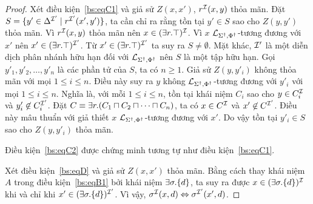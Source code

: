 \begin{proof}
	\semiItem Xét điều kiện~\eqref{bs:eqC1} và giả sử $Z(x,x')$, $r^{\mathcal{I}}(x,y)$ thỏa mãn. Đặt $S = \{y' \in \Delta^{\mathcal{I}'} \mid r^{\mathcal{I}'}(x',y')\}$, ta cần chỉ ra rằng tồn tại $y' \in S$ sao cho $Z(y,y')$ thỏa mãn. Vì $r^{\mathcal{I}}(x,y)$ thỏa mãn nên $x \in (\exists r.\top)^{\mathcal{I}}$. Vì $x$ $\mathcal{L}_{\Sigma^\dag,\Phi^\dag}$-tương đương với $x'$ nên $x' \in (\exists r.\top)^{\mathcal{I}'}$. Từ $x' \in (\exists r.\top)^{\mathcal{I}'}$ ta suy ra $S \not= \emptyset$. Mặt khác, $\mathcal{I}'$ là một diễn dịch phân nhánh hữu hạn đối với $\mathcal{L}_{\Sigma^\dag,\Phi^\dag}$ nên $S$ là một tập hữu hạn. Gọi $y'_1, y'_2, \ldots, y'_n$ là các phần tử của $S$, ta có $n \geq 1$.
	Giả sử $Z(y,y'_i)$ không thỏa mãn với mọi $1 \leq i \leq n$. Điều này suy ra $y$ không $\mathcal{L}_{\Sigma^\dag,\Phi^\dag}$-tương đương với $y'_i$ với mọi $1 \leq i \leq n$. Nghĩa là, với mỗi $1 \leq i \leq n$, tồn tại khái niệm $C_i$ sao cho $y \in C_i^{\mathcal{I}}$ và $y'_i \not\in C_i^{\mathcal{I}'}$. Đặt $C \equiv \exists r.(C_1 \sqcap C_2 \sqcap \cdots \sqcap C_n)$, ta có $x \in C^{\mathcal{I}}$ và $x' \not\in C^{\mathcal{I}'}$. Điều này mâu thuẩn với giả thiết $x$ $\mathcal{L}_{\Sigma^\dag,\Phi^\dag}$-tương đương với $x'$. Do vậy tồn tại $y'_i \in S$ sao cho $Z(y, y'_i)$ thỏa mãn.
	
	\semiItem Điều kiện~\eqref{bs:eqC2} được chứng minh tương tự như điều kiện~\eqref{bs:eqC1}.
	
	\semiItem{}Xét điều kiện~\eqref{bs:eqD} và giả sử $Z(x,x')$ thỏa mãn. Bằng cách thay khái niệm $A$ trong điều kiện~\eqref{bs:eqB1} bởi khái niệm $\exists \sigma.\{d\}$, ta suy ra được $x \in (\exists \sigma.\{d\})^{\mathcal{I}}$ khi và chỉ khi $x' \in (\exists \sigma.\{d\})^{\mathcal{I}'}$. Vì vậy, $\sigma^{\mathcal{I}}(x,d) \Leftrightarrow \sigma^{\mathcal{I}'}(x',d)$.
%		
	

\end{proof}
